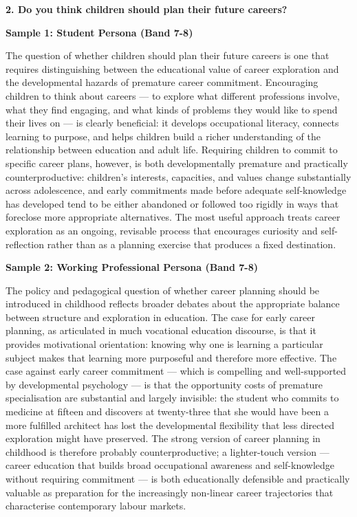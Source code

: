 \separator

\begin{ieltsquestion}
\textbf{2. Do you think children should plan their future careers?}
\end{ieltsquestion}
\textbf{Sample 1: Student Persona (Band 7-8)}

The question of whether children should plan their future careers is one that requires distinguishing between the educational value of career exploration and the developmental hazards of premature career commitment. Encouraging children to think about careers — to explore what different professions involve, what they find engaging, and what kinds of problems they would like to spend their lives on — is clearly beneficial: it develops occupational literacy, connects learning to purpose, and helps children build a richer understanding of the relationship between education and adult life. Requiring children to commit to specific career plans, however, is both developmentally premature and practically counterproductive: children's interests, capacities, and values change substantially across adolescence, and early commitments made before adequate self-knowledge has developed tend to be either abandoned or followed too rigidly in ways that foreclose more appropriate alternatives. The most useful approach treats career exploration as an ongoing, revisable process that encourages curiosity and self-reflection rather than as a planning exercise that produces a fixed destination.

\textbf{Sample 2: Working Professional Persona (Band 7-8)}

The policy and pedagogical question of whether career planning should be introduced in childhood reflects broader debates about the appropriate balance between structure and exploration in education. The case for early career planning, as articulated in much vocational education discourse, is that it provides motivational orientation: knowing why one is learning a particular subject makes that learning more purposeful and therefore more effective. The case against early career commitment — which is compelling and well-supported by developmental psychology — is that the opportunity costs of premature specialisation are substantial and largely invisible: the student who commits to medicine at fifteen and discovers at twenty-three that she would have been a more fulfilled architect has lost the developmental flexibility that less directed exploration might have preserved. The strong version of career planning in childhood is therefore probably counterproductive; a lighter-touch version — career education that builds broad occupational awareness and self-knowledge without requiring commitment — is both educationally defensible and practically valuable as preparation for the increasingly non-linear career trajectories that characterise contemporary labour markets.

